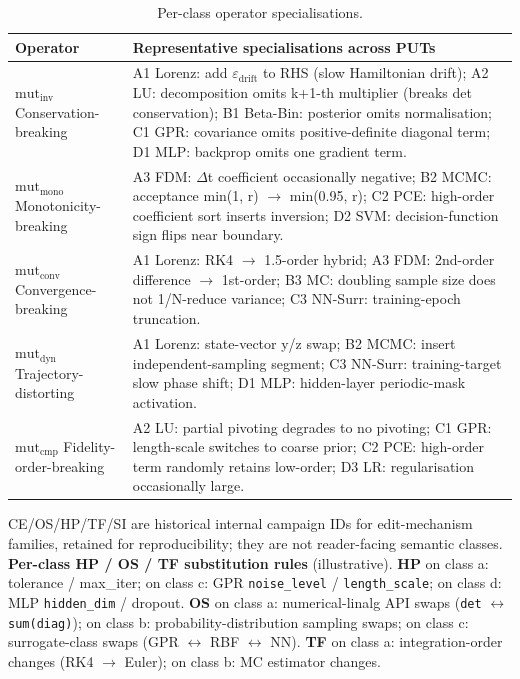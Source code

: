 \documentclass[manuscript,screen,review]{acmart}
\begin{document}
{%
\begin{longtable}[]{@{}
  >{\raggedright\arraybackslash}p{}
  >{\raggedright\arraybackslash}p{}@{}}
\caption{Per-class operator specialisations.}\label{tab:p2-17}\\
\toprule\noalign{}
\begin{minipage}[b]{\linewidth}\raggedright
Operator
\end{minipage} & \begin{minipage}[b]{\linewidth}\raggedright
Representative specialisations across PUTs
\end{minipage} \\
\midrule\noalign{}
\endfirsthead
\endhead
\bottomrule\noalign{}
\endlastfoot
\textbf{$\mathrm{mut}_{\mathrm{inv}}$} Conservation-breaking & A1 Lorenz: add $\varepsilon_{\mathrm{drift}}$ to RHS
(slow Hamiltonian drift); A2 LU: decomposition omits k+1-th multiplier
(breaks det conservation); B1 Beta-Bin: posterior omits normalisation;
C1 GPR: covariance omits positive-definite diagonal term; D1 MLP:
backprop omits one gradient term. \\
\textbf{$\mathrm{mut}_{\mathrm{mono}}$} Monotonicity-breaking & A3 FDM: $\Delta$t coefficient
occasionally negative; B2 MCMC: acceptance min(1, r) $\to$ min(0.95, r); C2
PCE: high-order coefficient sort inserts inversion; D2 SVM:
decision-function sign flips near boundary. \\
\textbf{$\mathrm{mut}_{\mathrm{conv}}$} Convergence-breaking & A1 Lorenz: RK4 $\to$ 1.5-order
hybrid; A3 FDM: 2nd-order difference $\to$ 1st-order; B3 MC: doubling sample
size does not 1/N-reduce variance; C3 NN-Surr: training-epoch
truncation. \\
\textbf{$\mathrm{mut}_{\mathrm{dyn}}$} Trajectory-distorting & A1 Lorenz: state-vector y/z
swap; B2 MCMC: insert independent-sampling segment; C3 NN-Surr:
training-target slow phase shift; D1 MLP: hidden-layer periodic-mask
activation. \\
\textbf{$\mathrm{mut}_{\mathrm{cmp}}$} Fidelity-order-breaking & A2 LU: partial pivoting
degrades to no pivoting; C1 GPR: length-scale switches to coarse prior;
C2 PCE: high-order term randomly retains low-order; D3 LR:
regularisation occasionally large. \\
\end{longtable}
}

CE/OS/HP/TF/SI are historical internal campaign IDs for edit-mechanism
families, retained for reproducibility; they are not reader-facing
semantic classes. \textbf{Per-class HP / OS / TF substitution rules} (illustrative).
\textbf{HP} on class a: tolerance / max\_iter; on class c: GPR
\texttt{noise\_level} / \texttt{length\_scale}; on class d: MLP
\texttt{hidden\_dim} / dropout. \textbf{OS} on class a: numerical-linalg
API swaps (\texttt{det} $\leftrightarrow$ \texttt{sum(diag)}); on class b:
probability-distribution sampling swaps; on class c: surrogate-class
swaps (GPR $\leftrightarrow$ RBF $\leftrightarrow$ NN). \textbf{TF} on class a: integration-order
changes (RK4 $\to$ Euler); on class b: MC estimator changes.
\end{document}
